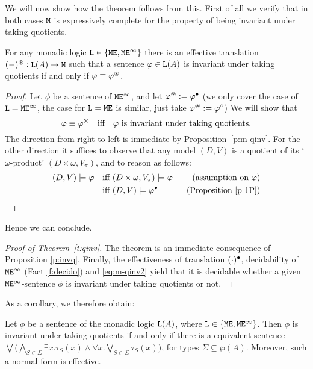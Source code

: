 \noindent
We will now show how the theorem follows from this.
First of all we verify that  in both cases $\mathtt{M}$ is expressively complete
for the property of being invariant under taking quotients.

\begin{proposition} 
\label{p:invq}
For any monadic logic $\mathtt{L} \in \{ \mathtt{M}\mathtt{E}, \mathtt{M}\mathtt{E}^{\infty} \}$ there is an effective 
translation $(-)^\oast: \mathtt{L}(A) \to \mathtt{M}$ such that a sentence $\varphi \in
\mathtt{L}(A)$ is invariant under taking quotients if and only if
$\varphi\equiv \varphi^\oast$.
\end{proposition}
\begin{proof}
Let $\phi$ be a sentence of $\mathtt{M}\mathtt{E}^{\infty}$, and let $\varphi^\oast \mathrel{:=} \varphi^{\bullet}$ (we only cover the case of $\mathtt{L} = 
\mathtt{M}\mathtt{E}^{\infty}$, the case for $\mathtt{L} = \mathtt{M}\mathtt{E}$ is similar, just take $\varphi^\oast \mathrel{:=} \varphi^{\circ}$)
We will show that 
\begin{equation}
\label{eq:m-qinv2}
\phi \equiv \phi^{\tinvq} \text{ iff } \text{$\phi$ is invariant under 
taking quotients}.
\end{equation}
The direction from right to left is immediate by Proposition~\ref{p:m-qinv}.
For the other direction it suffices to observe that any model $(D,V)$ is a 
quotient of its `$\omega$-product' $(D\times \omega, V_\pi)$, and to 
reason as follows:
\begin{align*}
(D,V) \models \phi 
   & \text{ iff } (D\times \omega, V_\pi) \models \phi
   & \text{(assumption on $\phi$)}
\\ & \text{ iff } (D,V) \models \phi^{\tmodb}
   & \text{(Proposition~\ref{p-1P})}
\end{align*}

\end{proof}

Hence we can conclude.
\begin{proof}[Proof of Theorem~\ref{t:qinv}]
The theorem is an immediate consequence of Proposition \ref{p:invq}.
Finally, the effectiveness of translation  $(\cdot)^{\bullet}$, decidability of $\mathtt{M}\mathtt{E}^{\infty}$ (Fact \ref{f:decido}) and \eqref{eq:m-qinv2} yield
that it is decidable whether a given $\mathtt{M}\mathtt{E}^{\infty}$-sentence $\phi$ is invariant under 
taking quotients or not.
\end{proof}

As a corollary, we therefore obtain:

\begin{corollary}\label{cor:qinv}
Let $\phi$ be a sentence of the monadic logic $\mathtt{L}(A)$, where $\mathtt{L} \in 
\{ \mathtt{M}\mathtt{E}, \mathtt{M}\mathtt{E}^{\infty} \}$. Then $\phi$ is invariant under taking quotients if and only if there is a 
equivalent sentence $\bigvee \big(\bigwedge_{S\in\Sigma} \exists x. \tau_S(x) \land 
   \forall x. \bigvee_{S\in\Sigma} \tau_S(x)\big)$, for  types $\Sigma\subseteq \wp(A)$. Moreover, such a normal form is effective.
\end{corollary}

